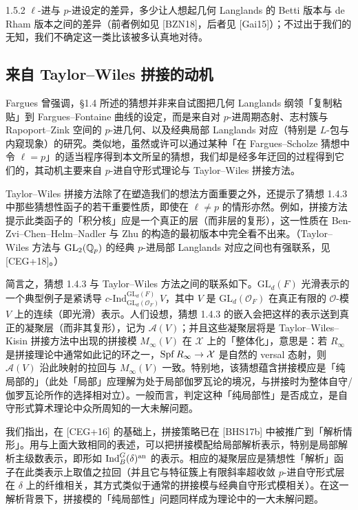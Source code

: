 \begin{rem}{1.5.2}\label{rem:a4-1-5-2}
$\ell$-进与 $p$-进设定的差异，多少让人想起几何 Langlands 的 Betti 版本与 de Rham 版本之间的差异（前者例如见 [BZN18]，后者见 [Gai15]）；不过出于我们的无知，我们不确定这一类比该被多认真地对待。
\end{rem}

\subsection{来自 Taylor--Wiles 拼接的动机}

Fargues 曾强调，§1.4 所述的猜想并非来自试图把几何 Langlands 纲领「复制粘贴」到 Fargues--Fontaine 曲线的设定，而是来自对 $p$-进周期态射、志村簇与 Rapoport--Zink 空间的 $p$-进几何、以及经典局部 Langlands 对应（特别是 $L$-包与内窥现象）的研究。类似地，虽然或许可以通过某种「在 Fargues--Scholze 猜想中令 $\ell=p$」的适当程序得到本文所呈的猜想，我们却是经多年迂回的过程得到它们的，其动机主要来自 $p$-进自守形式理论与 Taylor--Wiles 拼接方法。

Taylor--Wiles 拼接方法除了在塑造我们的想法方面重要之外，还提示了猜想 1.4.3 中那些猜想性函子的若干重要性质，即使在 $\ell\neq p$ 的情形亦然。例如，拼接方法提示此类函子的「积分核」应是一个真正的层（而非层的复形），这一性质在 Ben-Zvi--Chen--Helm--Nadler 与 Zhu 的构造的最初版本中完全看不出来。（Taylor--Wiles 方法与 $\mathrm{GL}_2(\mathbb{Q}_p)$ 的经典 $p$-进局部 Langlands 对应之间也有强联系，见 [CEG+18]。）

简言之，猜想 1.4.3 与 Taylor--Wiles 方法之间的联系如下。$\mathrm{GL}_d(F)$ 光滑表示的一个典型例子是紧诱导 $c\text{-Ind}_{\mathrm{GL}_d(\mathcal O_F)}^{\mathrm{GL}_d(F)}V$，其中 $V$ 是 $\mathrm{GL}_d(\mathcal O_F)$ 在真正有限的 $\mathcal O$-模 $V$ 上的连续（即光滑）表示。人们设想，猜想 1.4.3 的嵌入会把这样的表示送到真正的凝聚层（而非其复形），记为 $\mathscr A(V)$；并且这些凝聚层将是 Taylor--Wiles--Kisin 拼接方法中出现的拼接模 $M_\infty(V)$ 在 $\mathcal X$ 上的「整体化」，意思是：若 $R_\infty$ 是拼接理论中通常如此记的环之一，$\operatorname{Spf} R_\infty\to\mathcal X$ 是自然的 versal 态射，则 $\mathscr A(V)$ 沿此映射的拉回与 $M_\infty(V)$ 一致。特别地，该猜想蕴含拼接模应是「纯局部的」（此处「局部」应理解为处于局部伽罗瓦论的境况，与拼接时为整体自守/伽罗瓦论所作的选择相对立）。一般而言，判定这种「纯局部性」是否成立，是自守形式算术理论中众所周知的一大未解问题。

我们指出，在 [CEG+16] 的基础上，拼接策略已在 [BHS17b] 中被推广到「解析情形」。用与上面大致相同的表述，可以把拼接模配给局部解析表示，特别是局部解析主级数表示，即形如 $\operatorname{Ind}_B^G(\delta)^{\mathrm{an}}$ 的表示。相应的凝聚层应是猜想性「解析」函子在此类表示上取值之拉回（并且它与特征簇上有限斜率超收敛 $p$-进自守形式层在 $\delta$ 上的纤维相关，其方式类似于通常的拼接模与经典自守形式模相关）。在这一解析背景下，拼接模的「纯局部性」问题同样成为理论中的一大未解问题。

